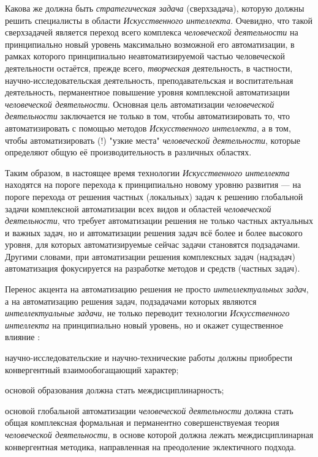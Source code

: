 Какова же должна быть \textit{стратегическая задача} (сверхзадача), которую должны решить специалисты в области \textit{Искусственного интеллекта}. Очевидно, что такой сверхзадачей является переход всего комплекса \textit{человеческой деятельности} на принципиально новый уровень максимально возможной его автоматизации, в рамках которого принципиально неавтоматизируемой частью человеческой деятельности остаётся, прежде всего, \textit{творческая} деятельность, в частности, научно-исследовательская деятельность, преподавательская и воспитательная деятельность, перманентное повышение уровня комплексной автоматизации \textit{человеческой деятельности}. Основная цель  автоматизации \textit{человеческой деятельности} заключается не только в том, чтобы автоматизировать то, что  автоматизировать с помощью методов \textit{Искусственного интеллекта}, а в том, чтобы автоматизировать (!) "узкие места"{} \textit{человеческой деятельности}, которые определяют общую её производительность в различных областях.

Таким образом, в настоящее время технологии \textit{Искусственного интеллекта} находятся на пороге перехода к принципиально новому уровню развития --- на пороге перехода от решения частных (локальных) задач к решению глобальной задачи комплексной автоматизации всех видов и областей \textit{человеческой деятельности}, что требует автоматизации решения не только частных актуальных и важных задач, но и автоматизации решения задач всё более и более высокого уровня, для которых автоматизируемые сейчас задачи становятся подзадачами. Другими словами, при автоматизации решения комплексных задач (надзадач) автоматизация фокусируется на разработке методов и средств  (частных задач).

Перенос акцента на автоматизацию решения не просто \textit{интеллектуальных задач}, а на автоматизацию решения  задач, подзадачами которых являются  \textit{интеллектуальные задачи}, не только переводит технологии \textit{Искусственного интеллекта} на принципиально новый уровень, но и окажет существенное влияние :
\begin{textitemize}
	\item  научно-исследовательские и научно-технические работы должны приобрести конвергентный взаимообогащающий характер;
	\item основой образования должна стать междисциплинарность;
	\item основой глобальной автоматизации \textit{человеческой деятельности} должна стать общая комплексная формальная и перманентно совершенствуемая теория \textit{человеческой деятельности}, в основе которой должна лежать междисциплинарная конвергентная методика, направленная на преодоление эклектичного подхода.
\end{textitemize}

